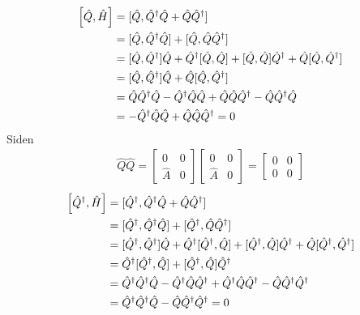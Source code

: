 \documentclass[norsk,a4paper,12pt]{article}
\begin{document}
\begin{equation}
\begin{aligned}
	\comm{\hat{Q}}{\hat{H}} &= [\hat{Q}, \hat{Q}^\dagger \hat{Q} + \hat{Q} \hat{Q}^\dagger] \\
	&= [\hat{Q}, \hat{Q}^\dagger \hat{Q}] + [\hat{Q}, \hat{Q} \hat{Q}^\dagger] \\
	&= [\hat{Q}, \hat{Q}^\dagger]\hat{Q} + \hat{Q}^\dagger [\hat{Q}, \hat{Q}] + [\hat{Q}, \hat{Q}]\hat{Q}^\dagger + \hat{Q} [\hat{Q}, \hat{Q}^\dagger] \\
	&= [\hat{Q}, \hat{Q}^\dagger]\hat{Q} + \hat{Q} [\hat{Q}, \hat{Q}^\dagger] \\
	&= \hat{Q}\hat{Q}^\dagger\hat{Q} - \hat{Q}^\dagger\hat{Q}\hat{Q} + \hat{Q}\hat{Q}\hat{Q}^\dagger - \hat{Q}\hat{Q}^\dagger\hat{Q} \\
	&= - \hat{Q}^\dagger\hat{Q}\hat{Q} + \hat{Q}\hat{Q}\hat{Q}^\dagger = 0
\end{aligned}
\end{equation}
Siden
\begin{equation}
\begin{aligned}
	\hat{Q}\hat{Q} = \left[ \begin{matrix} 0 & 0 \\ \hat A & 0 \end{matrix} \right] \left[ \begin{matrix} 0 & 0 \\ \hat A & 0 \end{matrix} \right] = \left[ \begin{matrix} 0 & 0 \\ 0 & 0 \end{matrix} \right]
\end{aligned}
\end{equation}
\begin{equation}
\begin{aligned}
	\comm{\hat{Q}^\dagger}{\hat{H}} &= [\hat{Q}^\dagger, \hat{Q}^\dagger \hat{Q} + \hat{Q} \hat{Q}^\dagger] \\
	&= [\hat{Q}^\dagger, \hat{Q}^\dagger \hat{Q}] + [\hat{Q}^\dagger, \hat{Q} \hat{Q}^\dagger] \\
	&= [\hat{Q}^\dagger, \hat{Q}^\dagger]\hat{Q} + \hat{Q}^\dagger [\hat{Q}^\dagger, \hat{Q}] + [\hat{Q}^\dagger, \hat{Q}]\hat{Q}^\dagger + \hat{Q} [\hat{Q}^\dagger, \hat{Q}^\dagger] \\
	&= \hat{Q}^\dagger [\hat{Q}^\dagger, \hat{Q}] + [\hat{Q}^\dagger, \hat{Q}]\hat{Q}^\dagger \\
	&= \hat{Q}^\dagger\hat{Q}^\dagger\hat{Q} - \hat{Q}^\dagger\hat{Q}\hat{Q}^\dagger + \hat{Q}^\dagger\hat{Q}\hat{Q}^\dagger - \hat{Q}\hat{Q}^\dagger\hat{Q}^\dagger \\
	&= \hat{Q}^\dagger\hat{Q}^\dagger\hat{Q} - \hat{Q}\hat{Q}^\dagger\hat{Q}^\dagger = 0
\end{aligned}
\end{equation}
\end{document}
